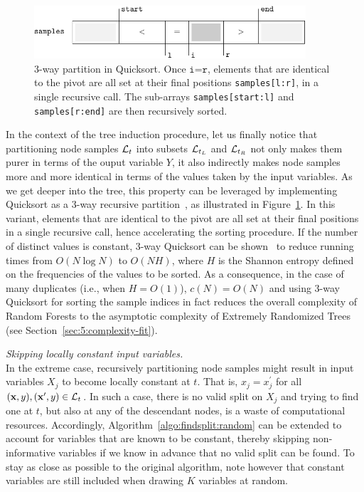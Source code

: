 \begin{description}
    \begin{figure}
        \centering
        \includegraphics[width=0.9\textwidth]{figures/ch5_sort.pdf}
        \caption{3-way partition in Quicksort. Once $\texttt{i=r}$, elements that are identical
                 to the pivot are all set at their final positions \texttt{samples[l:r]}, in a single
                 recursive call. The sub-arrays \texttt{samples[start:l]} and \texttt{samples[r:end]}
                 are then recursively sorted.}
        \label{fig:5:sort}
    \end{figure}

    In the context of the tree induction procedure, let us finally notice that
    partitioning node samples ${\cal L}_t$ into subsets ${\cal L}_{t_L}$ and
    ${\cal L}_{t_R}$ not only makes them purer in terms of the ouput variable
    $Y$, it also indirectly makes node samples more and more identical in terms
    of the values taken by the input variables. As we get deeper into the tree,
    this property can be leveraged by implementing Quicksort as a 3-way
    recursive partition~\citep{bentley:1993}, as illustrated in
    Figure~\ref{fig:5:sort}. In this variant, elements that are identical to
    the pivot are all set at their final positions in a single recursive call,
    hence accelerating the sorting procedure. If the number of distinct values
    is constant, 3-way Quicksort can be shown~\citep{sedgewick:2011}
    to reduce running times from $O(N \log N)$ to $O(N H)$, where $H$ is the
    Shannon entropy defined on the frequencies of the values to be sorted. As a
    consequence, in the case of many duplicates (i.e., when $H=O(1)$),
    $c(N)=O(N)$ and using 3-way Quicksort for sorting the sample indices in
    fact reduces the overall complexity of Random Forests to the asymptotic
    complexity of Extremely Randomized Trees (see Section~\ref{sec:5:complexity-fit}).

\item \textit{Skipping locally constant input variables.}\hfill \\
    In the extreme case, recursively partitioning node samples might result in
    input variables $X_j$ to become locally constant at $t$. That is,
    $x_j=x^\prime_j$ for all $(\mathbf{x},y), (\mathbf{x}^\prime, y) \in {\cal
    L}_t$. In such  a case, there is no valid split on $X_j$ and trying to find
    one at $t$, but also at any of the descendant nodes, is a waste of
    computational resources. Accordingly, Algorithm~\ref{algo:findsplit:random}
    can be extended to account for variables that are known to be constant, thereby skipping
    non-informative variables if we know in advance that no valid split can be found.
    To stay as close as possible to the original algorithm, note however that constant
    variables are still included when drawing $K$ variables at random.


\end{description}
